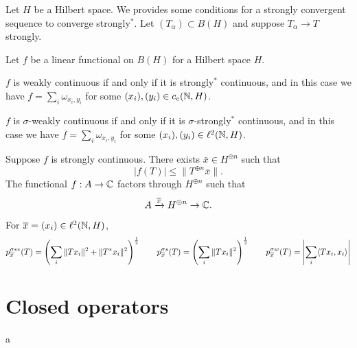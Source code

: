 \documentclass{../../large}
\begin{document}
\begin{prb}
Let $H$ be a Hilbert space.
We provides some conditions for a strongly convergent sequence to converge strongly$^*$.
Let $(T_\alpha)\subset B(H)$ and suppose $T_\alpha\to T$ strongly.
\end{prb}

\begin{prb}
Let $f$ be a linear functional on $B(H)$ for a Hilbert space $H$.
\begin{parts}
\item
$f$ is weakly continuous if and only if it is strongly$^*$ continuous, and in this case we have $f=\sum_i\omega_{x_i,y_i}$ for some $(x_i),(y_i)\in c_c(\mathbb{N},H)$.
\item
$f$ is $\sigma$-weakly continuous if and only if it is $\sigma$-strongly$^*$ continuous, and in this case we have $f=\sum_i\omega_{x_i,y_i}$ for some $(x_i),(y_i)\in\ell^2(\mathbb{N},H)$.
\end{parts}
\end{prb}
\begin{pf}
Suppose $f$ is strongly continuous.
There exists $\bar x\in H^{\oplus n}$ such that
\[|f(T)|\le\|T^{\oplus n}\bar x\|.\]
The functional $f:A\to\mathbb{C}$ factors through $H^{\oplus n}$ such that
\[A\xrightarrow{\overline x}H^{\oplus n}\to\mathbb{C}.\]
\end{pf}


For $\overline x=(x_i)\in\ell^2(\mathbb{N},H)$,
\[p_{\overline x}^{\sigma s*}(T)=\left(\sum_i\|Tx_i\|^2+\|T^*x_i\|^2\right)^{\frac12}\qquad
p_{\overline x}^{\sigma s}(T)=\left(\sum_i\|Tx_i\|^2\right)^{\frac12}\qquad
p_{\overline x}^{\sigma w}(T)=\left|\sum_i\langle Tx_i,x_i\rangle\right|\]







\section{Closed operators}

\begin{prb}
\begin{parts}
\item a
\end{parts}
\end{prb}
\end{document}

